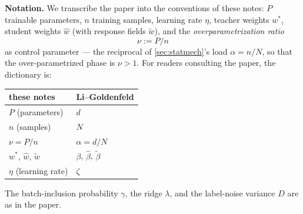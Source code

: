 \documentclass[11pt]{article}
\begin{document}
\textbf{Notation.} We transcribe the paper into the conventions of these notes: $P$ trainable parameters, $n$ training samples, learning rate $\eta$, teacher weights $w^*$, student weights $\hat w$ (with response fields $\tilde w$), and the \emph{overparametrization ratio}
%
\begin{equation}
    \nu := P/n
\end{equation}
%
as control parameter --- the reciprocal of \cref{sec:statmech}'s load $\alpha = n/N$, so that the over-parametrized phase is $\nu>1$. For readers consulting the paper, the dictionary is:
%
\begin{center}
\begin{tabular}{l|l}
these notes & Li--Goldenfeld \cite{liBrokenErgodicityViolation2026} \\\hline
$P$ (parameters) & $d$ \\
$n$ (samples) & $N$ \\
$\nu = P/n$ & $\alpha = d/N$ \\
$w^*$, $\hat w$, $\tilde w$ & $\beta$, $\hat\beta$, $\tilde\beta$ \\
$\eta$ (learning rate) & $\zeta$
\end{tabular}
\end{center}
%
The batch-inclusion probability $\gamma$, the ridge $\lambda$, and the label-noise variance $D$ are as in the paper.
\end{document}
